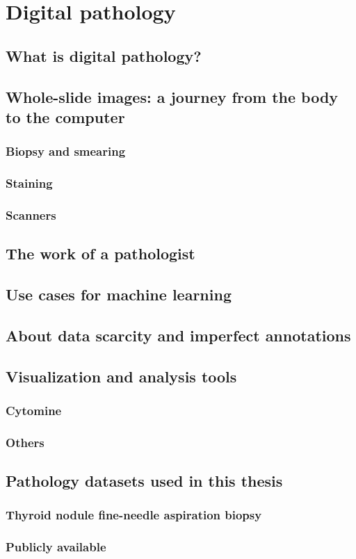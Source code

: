 \chapter{Digital pathology}
\label{chap:backdp}

\section{What is digital pathology?}

\section{Whole-slide images: a journey from the body to the computer}

\subsection{Biopsy and smearing}
\subsection{Staining}
\subsection{Scanners}

\section{The work of a pathologist}

\section{Use cases for machine learning}

\section{About data scarcity and imperfect annotations}

\parencite{van2019strategies}

\section{Visualization and analysis tools}

\subsection{Cytomine}

\subsection{Others}

\section{Pathology datasets used in this thesis}



\subsection{Thyroid nodule fine-needle aspiration biopsy}



\subsection{Publicly available}